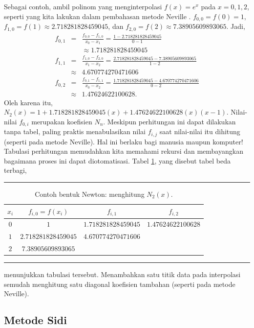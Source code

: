 \label{NewtonPolyExample}Sebagai contoh, ambil polinom yang menginterpolasi
$f(x)=e^{x}$ pada $x=0,1,2$, seperti yang kita lakukan dalam pembahasan
metode Neville . $f_{0,0}=f(0)=1$,
$f_{1,0}=f(1)\approx2.718281828459045$, dan $f_{2,0}=f(2)\approx7.38905609893065$.
Jadi,
\begin{eqnarray*}
f_{0,1} & = & \frac{f_{0,0}-f_{1,0}}{x_{0}-x_{1}}=\frac{1-2.718281828459045}{0-1}\\
 &  & \approx1.718281828459045\\
f_{1,1} & = & \frac{f_{1,0}-f_{2,0}}{x_{1}-x_{2}}=\frac{2.718281828459045-7.38905609893065}{1-2}\\
 & \approx & 4.670774270471606\\
f_{0,2} & = & \frac{f_{0,1}-f_{1,1}}{x_{0}-x_{2}}=\frac{1.718281828459045-4.670774270471606}{0-2}\\
 & \approx & 1.47624622100628.
\end{eqnarray*}
Oleh karena itu, $N_{2}(x)=1+1.718281828459045(x)+1.47624622100628(x)(x-1)$.
Nilai-nilai $f_{0,i}$ merupakan koefisien $N_{n}$. Meskipun perhitungan
ini dapat dilakukan tanpa tabel, paling praktis menabulasikan nilai
$f_{i,j}$ saat nilai-nilai itu dihitung (seperti pada metode Neville).
Hal ini berlaku bagi manusia maupun komputer! Tabulasi perhitungan
memudahkan kita memahami rekursi dan membayangkan bagaimana proses
ini dapat diotomatisasi. Tabel \ref{tab:NewtonPolyExample}, yang
disebut tabel beda terbagi, 
\begin{table}
\hrule \caption{\label{tab:NewtonPolyExample}Contoh bentuk Newton: menghitung $N_{2}(x)$.}

\centering{}\medskip{}
\begin{tabular}{cccc}
$x_{i}$ & $f_{i,0}=f(x_{i})$ & $f_{i,1}$ & $f_{i,2}$\tabularnewline
\hline 
$0$ & $1$ & $1.718281828459045$ & $1.47624622100628$\tabularnewline
$1$ & $2.718281828459045$ & $4.670774270471606$ & \tabularnewline
$2$ & $7.38905609893065$ &  & \tabularnewline
\end{tabular}\medskip{}
\hrule 
\end{table}
 menunjukkan tabulasi tersebut. Menambahkan satu titik data pada interpolasi
semudah menghitung satu diagonal koefisien tambahan (seperti pada
metode Neville).

\subsection{Metode Sidi }

